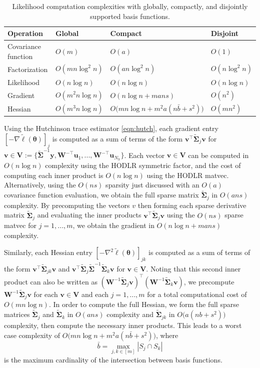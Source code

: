 \documentclass{article}
\numberwithin{equation}{section}
\newcommand{\cm}{\bm{\Sigma}}
\newcommand{\acm}{\widetilde{\cm}}
\begin{document}
\begin{table}
  \centering
  \begin{tabular}{p{}p{}p{}p{}}
    \hline
    Operation & Global & Compact & Disjoint \\
    \hline \hline
    Covariance function & $O(m)$ & $O(a)$ & $O(1)$ \\
    Factorization & $O(m n\log^2 n)$ & $O(a n\log^2 n)$ & $O(n\log^2 n)$ \\
    Likelihood & $O(n\log n)$ & $O(n\log n)$ & $O(n\log n)$ \\
    Gradient & $O(m^2 n\log n)$ & $O(n\log n + mans)$ & $O(n^2)$ \\
    Hessian & $O(m^3 n\log n)$ & $O\big(m n \log n + m^2a(n\bar{b} + s^2)\big)$ & $O(mn^2)$ \\
    \hline
  \end{tabular}
  \caption{Likelihood computation complexities with globally, compactly, and disjointly supported basis functions.}
  \label{tab:complexity}
\end{table}

Using the Hutchinson trace estimator \ref{eqn:hutch}, each gradient entry $[-\nabla \tilde{\ell}(\bm{\theta})]_j$ is computed as a sum of terms of the form $\bm{v}^\top \acm_j \bm{v}$ for $\bm{v} \in \bm{V} := \{\acm^{-1} \bm{y}, \bm{W}^{-\top} \bm{u}_1, ..., \bm{W}^{-\top} \bm{u}_{N_h}\}$.
Each vector $\bm{v} \in \bm{V}$ can be computed in $O(n \log n)$ complexity using the HODLR symmetric factor, and the cost of computing each inner product is $O(n\log n)$ using the HODLR matvec. Alternatively, using the $O(ns)$ sparsity just discussed with an $O(a)$ covariance function evaluation, we obtain the full sparse matrix $\acm_j$ in $O(ans)$ complexity. By precomputing the vectors $v$ then forming each sparse derivative matrix $\acm_j$ and evaluating the inner products $\bm{v}^\top \acm_j \bm{v}$ using the $O(ns)$ sparse matvec for $j=1,...,m$, we obtain the gradient in $O(n \log n + mans)$ complexity.

Similarly, each Hessian entry $[-\nabla^2 \tilde{\ell}(\bm{\theta})]_{jk}$ is computed as a sum of terms of the form $\bm{v}^\top \acm_{jk} \bm{v}$ and $\bm{v}^\top \acm_j \acm^{-1} \acm_k \bm{v}$ for $\bm{v} \in \bm{V}$.
Noting that this second inner product can also be written as $(\bm{W}^{-1} \acm_j \bm{v})^\top (\bm{W}^{-1} \acm_k \bm{v})$, we precompute $\bm{W}^{-1} \acm_j \bm{v}$ for each $\bm{v} \in \bm{V}$ and each $j=1,...,m$ for a total computational cost of $O(m n \log n)$.
In order to compute the full Hessian, we form the full sparse matrices $\acm_j$ and $\acm_k$ in $O(ans)$ complexity and $\acm_{jk}$ in $O\big(a(nb + s^2)\big)$ complexity, then compute the necessary inner products. This leads to a worst case complexity of $O\big(m n \log n + m^2a(n\bar{b} + s^2)\big)$, where
$$\bar{b} = \max_{j,k \in [m]} |S_j \cap S_k|$$
is the maximum cardinality of the intersection between basis functions.
\end{document}
